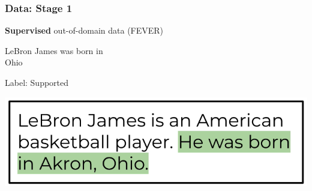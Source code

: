 \documentclass[13.5pt,aspecratio=169, xcolor=dvipsnames]{beamer}
\begin{document}
\begin{frame}
    \onehalfspacing
        \frametitle{Data: Stage 1}
        \begin{minipage}[t]{0.42\textwidth}
            {
            \vspace*{-7em}
            \centering
            \textbf{Supervised} out-of-domain data (FEVER)

            

            \begin{block}{}
                LeBron James was born in \\ Ohio
            \end{block}
            {

                \vspace*{-2em}
                \hspace{3em}
                \begin{minipage}{0.7\textwidth}

                \begin{block}{}
                    \centering
                    Label: Supported
                \end{block}
            \end{minipage}
            }

            \bigskip
            \includegraphics[width=\textwidth]{LeBron_James_claim.png}
            }
        \end{minipage}
        \hfill\vrule height 90pt width 2pt\hfill
        \begin{minipage}[t]{0.54\textwidth}
            {
            \vspace*{-7em}

             {

}}
\end{minipage}
\end{frame}
\end{document}
